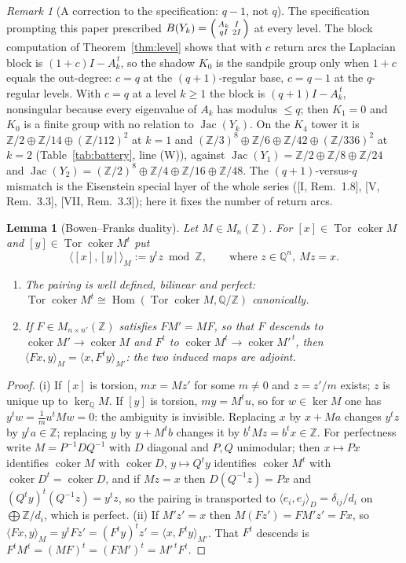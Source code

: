 \documentclass[11pt]{amsart}
\numberwithin{equation}{section}
\newtheorem{lemma}[theorem]{Lemma}
\theoremstyle{definition}
\theoremstyle{remark}
\newtheorem{remark}[theorem]{Remark}
\newcommand{\Z}{\mathbb{Z}}
\newcommand{\Q}{\mathbb{Q}}
\newcommand{\Jac}{\operatorname{Jac}}
\newcommand{\coker}{\operatorname{coker}}
\newcommand{\Tor}{\operatorname{Tor}}
\newcommand{\Hom}{\operatorname{Hom}}
\begin{document}
\begin{remark}[A correction to the specification: $q-1$, not $q$]\label{rem:cq}
The specification prompting this paper prescribed $B(Y_k)=\begin{psmallmatrix}A_k&I\\
qI&2I\end{psmallmatrix}$ at every level. The block computation of
Theorem~\ref{thm:level} shows that with $c$ return arcs the Laplacian block is
$(1+c)I-A_k^{\,t}$, so the shadow $K_0$ is the sandpile group only when $1+c$ equals the
out-degree: $c=q$ at the $(q{+}1)$-regular base, $c=q-1$ at the $q$-regular levels.
With $c=q$ at a level $k\ge1$ the block is $(q{+}1)I-A_k^{\,t}$, nonsingular because
every eigenvalue of $A_k$ has modulus $\le q$; then $K_1=0$ and $K_0$ is a finite group
with no relation to $\Jac(Y_k)$. On the $K_4$ tower it is $\Z/2\oplus\Z/14\oplus(\Z/112)^2$
at $k=1$ and $(\Z/3)^8\oplus\Z/6\oplus\Z/42\oplus(\Z/336)^2$ at $k=2$
(Table~\ref{tab:battery}, line (W)), against $\Jac(Y_1)=\Z/2\oplus\Z/8\oplus\Z/24$ and
$\Jac(Y_2)=(\Z/2)^8\oplus\Z/4\oplus\Z/16\oplus\Z/48$. The $(q{+}1)$-versus-$q$ mismatch
is the Eisenstein special layer of the whole series ([I, Rem.~1.8], [V, Rem.~3.3],
[VII, Rem.~3.3]); here it fixes the number of return arcs.
\end{remark}

\begin{lemma}[Bowen--Franks duality]\label{lem:dual}
Let $M\in M_n(\Z)$. For $[x]\in\Tor\coker M$ and $[y]\in\Tor\coker M^{t}$ put
\[
\langle[x],[y]\rangle_M:=y^{t}z\bmod\Z,\qquad\text{where } z\in\Q^n,\ Mz=x .
\]
\begin{enumerate}
\item[(i)] The pairing is well defined, bilinear and perfect:
$\Tor\coker M^{t}\cong\Hom(\Tor\coker M,\Q/\Z)$ canonically.
\item[(ii)] If $F\in M_{n\times n'}(\Z)$ satisfies $FM'=MF$, so that $F$ descends to
$\coker M'\to\coker M$ and $F^{t}$ to $\coker M^{t}\to\coker M'^{\,t}$, then
$\langle Fx,y\rangle_M=\langle x,F^{t}y\rangle_{M'}$: the two induced maps are adjoint.
\end{enumerate}
\end{lemma}

\begin{proof}
(i) If $[x]$ is torsion, $mx=Mz'$ for some $m\ne0$ and $z=z'/m$ exists; $z$ is unique
up to $\ker_\Q M$. If $[y]$ is torsion, $my=M^{t}u$, so for $w\in\ker M$ one has
$y^{t}w=\frac1m u^{t}Mw=0$: the ambiguity is invisible. Replacing $x$ by $x+Ma$ changes
$y^{t}z$ by $y^{t}a\in\Z$; replacing $y$ by $y+M^{t}b$ changes it by $b^{t}Mz=b^{t}x\in\Z$.
For perfectness write $M=P^{-1}DQ^{-1}$ with $D$ diagonal and $P,Q$ unimodular; then
$x\mapsto Px$ identifies $\coker M$ with $\coker D$, $y\mapsto Q^{t}y$ identifies
$\coker M^{t}$ with $\coker D^{t}=\coker D$, and if $Mz=x$ then $D(Q^{-1}z)=Px$ and
$(Q^{t}y)^{t}(Q^{-1}z)=y^{t}z$, so the pairing is transported to
$\langle e_i,e_j\rangle_D=\delta_{ij}/d_i$ on $\bigoplus\Z/d_i$, which is perfect.
(ii) If $M'z'=x$ then $M(Fz')=FM'z'=Fx$, so $\langle Fx,y\rangle_M=y^{t}Fz'=
(F^{t}y)^{t}z'=\langle x,F^{t}y\rangle_{M'}$. That $F^{t}$ descends is
$F^{t}M^{t}=(MF)^{t}=(FM')^{t}=M'^{\,t}F^{t}$.
\end{proof}
\end{document}
